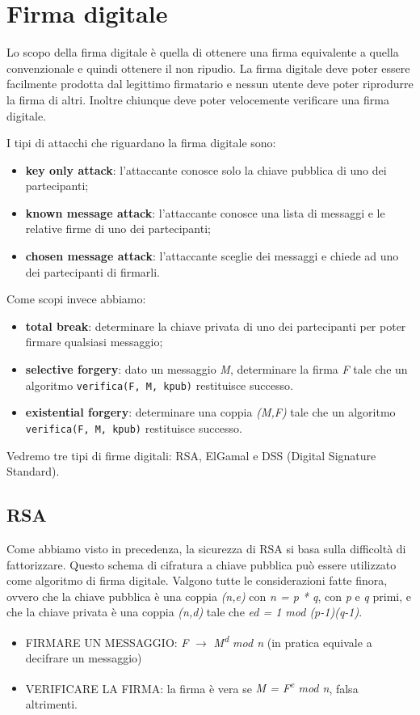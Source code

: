 \section{Firma digitale}
Lo scopo della firma digitale è quella di ottenere una firma equivalente a quella convenzionale e quindi ottenere il non ripudio. La firma digitale deve poter essere facilmente prodotta dal legittimo firmatario e nessun utente deve poter riprodurre la firma di altri. Inoltre chiunque deve poter velocemente verificare una firma digitale. 

I tipi di attacchi che riguardano la firma digitale sono:
\begin{itemize}
    \item \textbf{key only attack}: l'attaccante conosce solo la chiave pubblica di uno dei partecipanti;
    \item \textbf{known message attack}: l'attaccante conosce una lista di messaggi e le relative firme di uno dei partecipanti;
    \item \textbf{chosen message attack}: l'attaccante sceglie dei messaggi e chiede ad uno dei partecipanti di firmarli.
\end{itemize}
Come scopi invece abbiamo:
\begin{itemize}
    \item \textbf{total break}: determinare la chiave privata di uno dei partecipanti per poter firmare qualsiasi messaggio;
    \item \textbf{selective forgery}: dato un messaggio \textit{M}, determinare la firma \textit{F} tale che un algoritmo \texttt{verifica(F, M, kpub)} restituisce successo.
    \item \textbf{existential forgery}: determinare una coppia \textit{(M,F)} tale che un algoritmo \texttt{verifica(F, M, kpub)} restituisce successo.
\end{itemize}
Vedremo tre tipi di firme digitali: RSA, ElGamal e DSS (Digital Signature Standard).

\subsection{RSA}
Come abbiamo visto in precedenza, la sicurezza di RSA si basa sulla difficoltà di fattorizzare. Questo schema di cifratura a chiave pubblica può essere utilizzato come algoritmo di firma digitale. Valgono tutte le considerazioni fatte finora, ovvero che la chiave pubblica è una coppia \textit{(n,e)} con \textit{n = p * q}, con \textit{p} e \textit{q} primi, e che la chiave privata è una coppia \textit{(n,d)} tale che \textit{ed = 1 mod (p-1)(q-1)}.
\begin{itemize}
    \item FIRMARE UN MESSAGGIO: \textit{F} $\rightarrow$ \textit{M\textsuperscript{d} mod n} (in pratica equivale a decifrare un messaggio)
    \item VERIFICARE LA FIRMA: la firma è vera se \textit{M = F\textsuperscript{e} mod n}, falsa altrimenti.
\end{itemize}

